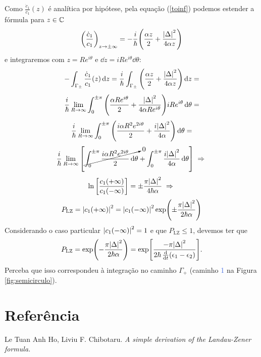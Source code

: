\documentclass[a4paper,fleqn,12pt]{article}
\begin{document}
Como $\frac{\dot{c}_1}{c_1}(z)$ é analítica por hipótese, pela equação (\ref{toinf}) podemos estender a fórmula para $z \in \mathbb{C}$
$$
\qty(\frac{\dot{c}_1}{c_1})_{z \to \pm \infty} = -\frac{i}{\hbar} \qty(\frac{\alpha z}{2} + \frac{\abs{\Delta}^2}{4\alpha z})
$$
e integraremos com $z = R e^{i\theta}$ e $\dd{z} = i R e^{i\theta} \dd{\theta}$:
$$
-\int_{\Gamma_{\pm}} \frac{\dot{c}_1}{c_1}(z) \dd{z} =
\frac{i}{\hbar} \int_{\Gamma_\pm} \qty(\frac{\alpha z}{2} + \frac{\abs{\Delta}^2}{4\alpha z}) \dd{z} =
$$
$$
\frac{i}{\hbar} \lim_{R \to \infty} \int_0^{\pm \pi}
\qty(\frac{\alpha R e^{i\theta}}{2} + \frac{\abs{\Delta}^2}{4\alpha R e^{i\theta}})
i R e^{i\theta} \dd{\theta} =
$$
$$
\frac{i}{\hbar} \lim_{R \to \infty} \int_0^{\pm \pi}
\qty(\frac{i \alpha R^2 e^{2i\theta}}{2}+\frac{i \abs{\Delta}^2}{4\alpha}) \dd{\theta} =
$$
$$
\frac{i}{\hbar} \lim_{R \to \infty} \qty[
\cancelto{0}{ \int_0^{\pm \pi} \frac{i \alpha R^2 e^{2i\theta}}{2} \dd{\theta} } +
\int_0^{\pm \pi} \frac{i \abs{\Delta}^2}{4\alpha} \dd{\theta} ] \; \Rightarrow \;
$$
$$
\ln\qty[\frac{c_1(+\infty)}{c_1(-\infty)}] =
\pm \frac{\pi \abs{\Delta}^2}{4 \hbar \alpha} \; \Rightarrow \;
$$
\n
$$
P_{\text{LZ}} = \abs{c_1(+\infty)}^2 =
\abs{c_1(-\infty)}^2 \exp(\pm\frac{\pi\abs{\Delta}^2}{2\hbar\alpha})
$$
Considerando o caso particular $\abs{c_1(-\infty)}^2 = 1$ e que $P_{\text{LZ}} \leq 1$,
devemos ter que
$$
P_{\text{LZ}} = \exp(-\frac{\pi\abs{\Delta}^2}{2\hbar\alpha}) = \exp[\frac{- \pi \abs{\Delta}^2}{2\hbar \, \dv{t}(\epsilon_1 - \epsilon_2)}].
$$
Perceba que isso correspondeu à integração no caminho $\Gamma_+$ (caminho \textcolor{RoyalBlue}{1} na Figura \ref{fig:semicirculo}).

\section{Referência}

Le Tuan Anh Ho, Liviu F. Chibotaru. \textit{A simple derivation of the Landau-Zener formula.}
\end{document}
